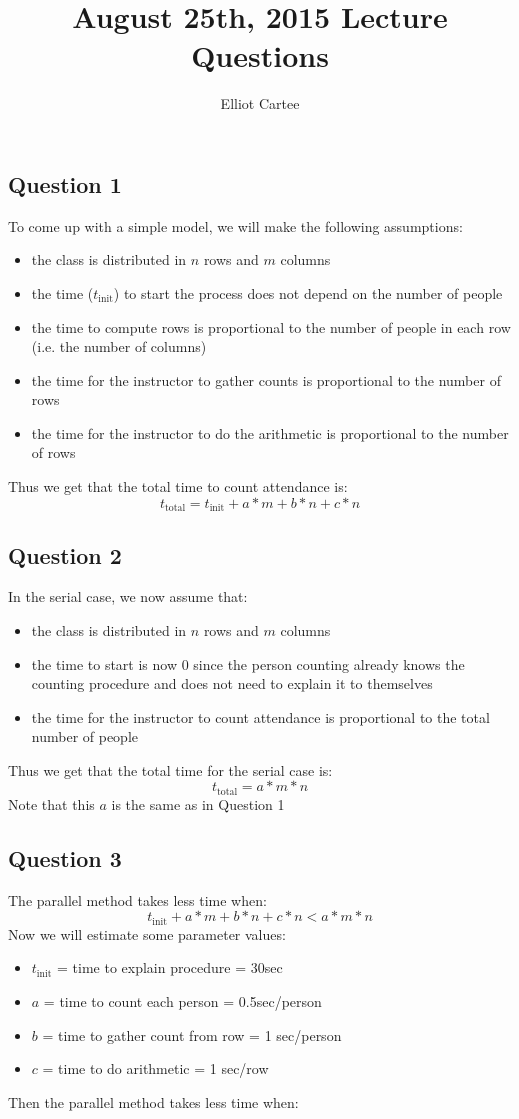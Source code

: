 \documentclass[11pt]{amsart}
\title{August 25th, 2015 Lecture Questions}
\author{Elliot Cartee}
\begin{document}
\maketitle
\subsection*{Question 1}
To come up with a simple model, we will make the following assumptions:
\begin{itemize}
	\item the class is distributed in $n$ rows and $m$ columns
	\item the time ($t_\text{init}$) to start the process does not depend on the number of people
	\item the time to compute rows is proportional to the number of people in each row (i.e. the number of columns)
	\item the time for the instructor to gather counts is proportional to the number of rows
	\item the time for the instructor to do the arithmetic is proportional to the number of rows
\end{itemize}
Thus we get that the total time to count attendance is:
$$
t_\text{total} = t_\text{init} + a*m + b*n + c*n
$$

\subsection*{Question 2}
In the serial case, we now assume that:
\begin{itemize}
	\item the class is distributed in $n$ rows and $m$ columns
	\item the time to start is now $0$ since the person counting already knows the counting procedure and does not need to explain it to themselves
	\item the time for the instructor to count attendance is proportional to the total number of people
\end{itemize}
Thus we get that the total time for the serial case is:
$$
t_\text{total} = a*m*n
$$
Note that this $a$ is the same as in Question 1

\subsection*{Question 3}

The parallel method takes less time when:
$$
t_\text{init} + a*m + b*n + c*n < a*m*n
$$
Now we will estimate some parameter values:
\begin{itemize}
\item $t_\text{init}$ = time to explain procedure     = 30sec

\item $a$      = time to count each person     = 0.5sec/person

\item $b$      = time to gather count from row = 1 sec/person

\item $c$      = time to do arithmetic         = 1 sec/row
\end{itemize}
Then the parallel method takes less time when:
\end{document}
